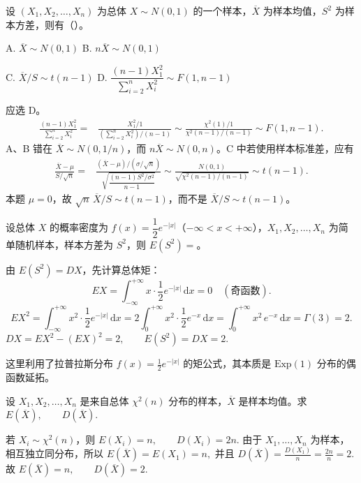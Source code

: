 \documentclass[lang=cn,11pt]{elegantbook}
\begin{document}
\begin{exercise}\label{exer:src-paper1-choice-04}\label{prob:p1-choice-04}
设 \((X_1,X_2,\dots,X_n)\) 为总体 \(X\sim N(0,1)\) 的一个样本，\(\overline X\) 为样本均值，\(S^2\) 为样本方差，则有（\quad）。\par
A. \(\overline X\sim N(0,1)\)\quad
B. \(n\overline X\sim N(0,1)\)\par
C. \(\overline X/S\sim t(n-1)\)\quad
D. \(\dfrac{(n-1)X_1^2}{\sum_{i=2}^{n}X_i^2}\sim F(1,n-1)\)
\end{exercise}
\begin{solution}
应选 D。
\begin{align*}
\frac{(n-1)X_1^2}{\sum_{i=2}^{n}X_i^2}
=&\frac{X_1^2/1}{\left(\sum_{i=2}^{n}X_i^2\right)/(n-1)}
\sim\frac{\chi^2(1)/1}{\chi^2(n-1)/(n-1)}\sim F(1,n-1).
\end{align*}
A、B 错在 \(\overline X\sim N(0,1/n)\)，而 \(n\overline X\sim N(0,n)\)。C 中若使用样本标准差，应有
\begin{align*}
\frac{\overline X-\mu}{S/\sqrt n}
=&\frac{(\overline X-\mu)/(\sigma/\sqrt n)}{\sqrt{\dfrac{(n-1)S^2/\sigma^2}{n-1}}}
\sim\frac{N(0,1)}{\sqrt{\chi^2(n-1)/(n-1)}}\sim t(n-1).
\end{align*}
本题 \(\mu=0\)，故 \(\sqrt n\,\overline X/S\sim t(n-1)\)，而不是 \(\overline X/S\sim t(n-1)\)。
\end{solution}


\begin{exercise}[样本方差的期望] \label{ex:statistic_05}
设总体 \(X\) 的概率密度为 \(f(x)=\dfrac{1}{2}e^{-|x|}\)（\(-\infty<x<+\infty\)），\(X_1,X_2,\dots,X_n\) 为简单随机样本，样本方差为 \(S^2\)，则 \(E(S^2)=\)\underline{\qquad}。
\end{exercise}
\begin{solution}
由 \(E(S^2)=DX\)，先计算总体矩：
\[
EX=\int_{-\infty}^{+\infty}x\cdot\frac{1}{2}e^{-|x|}\,\mathrm{d}x=0 \quad(\text{奇函数}).
\]
\[
EX^2=\int_{-\infty}^{+\infty}x^2\cdot\frac{1}{2}e^{-|x|}\,\mathrm{d}x
=2\int_0^{+\infty}x^2\cdot\frac{1}{2}e^{-x}\,\mathrm{d}x
=\int_0^{+\infty}x^2\,e^{-x}\,\mathrm{d}x=\Gamma(3)=2.
\]
\(
DX=EX^2-(EX)^2=2,\qquad E(S^2)=DX=2.
\)
\begin{note}
这里利用了拉普拉斯分布 \(f(x)=\frac{1}{2}e^{-|x|}\) 的矩公式，其本质是 \(\text{Exp}(1)\) 分布的偶函数延拓。
\end{note}
\end{solution}

\begin{exercise}\label{exer:src-2008-01-3c-iii-05}\label{exer:src-paper4-iii-05}
设 \(X_1,X_2,\dots,X_n\) 是来自总体 \(\chi^2(n)\) 分布的样本，\(\overline X\) 是样本均值。求
\(
E(\overline X),\qquad D(\overline X).
\)
\end{exercise}
\begin{solution}
若 \(X_i\sim\chi^2(n)\)，则
\(
E(X_i)=n,\qquad D(X_i)=2n.
\)
由于 \(X_1,\dots,X_n\) 为样本，相互独立同分布，所以
\(
E(\overline X)=E(X_1)=n,
\)
并且
\(
D(\overline X)=\frac{D(X_1)}{n}
=\frac{2n}{n}=2.
\)
故
\(
E(\overline X)=n,\qquad D(\overline X)=2.
\)
\end{solution}
\end{document}
